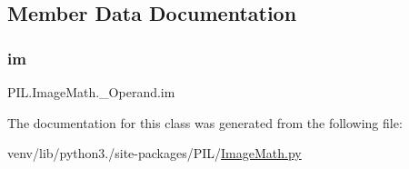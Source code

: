 \subsection{Member Data Documentation}
\mbox{\label{classPIL_1_1ImageMath_1_1__Operand_a2ce3cb32228ab976e70061bd3b94f1e0}} 
\subsubsection{\texorpdfstring{im}{im}}
{\footnotesize\ttfamily P\+I\+L.\+Image\+Math.\+\_\+\+Operand.\+im}



The documentation for this class was generated from the following file\+:\begin{DoxyCompactItemize}
\item 
venv/lib/python3./site-\/packages/\+P\+I\+L/\hyperlink{ImageMath_8py}{Image\+Math.\+py}\end{DoxyCompactItemize}

